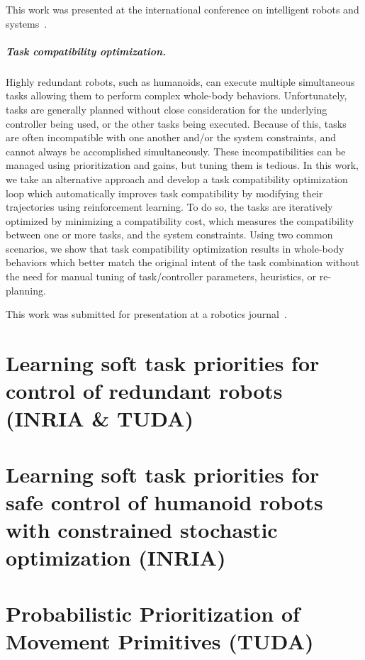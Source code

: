 \documentclass[12pt,a4paper,twoside]{report}
\begin{document}
This work was presented at the international conference on intelligent robots and systems~\cite{lober_IROS2015}.

\paragraph*{Task compatibility optimization.}

Highly redundant robots, such as humanoids, can execute multiple simultaneous tasks allowing them to perform complex whole-body behaviors. Unfortunately, tasks are generally planned without close consideration for the underlying controller being used, or the other tasks being executed. Because of this, tasks are often incompatible with one another and/or the system constraints, and cannot always be accomplished simultaneously. These incompatibilities can be managed using prioritization and gains, but tuning them is tedious. In this work, we take an alternative approach and develop a task compatibility optimization loop which automatically improves task compatibility by modifying their trajectories using reinforcement learning. To do so, the tasks are iteratively optimized by minimizing a compatibility cost, which measures the compatibility between one or more tasks, and the system constraints. Using two common scenarios, we show that task compatibility optimization results in whole-body behaviors which better match the original intent of the task combination without the need for manual tuning of task/controller parameters, heuristics, or re-planning.

This work was submitted for presentation at a robotics journal~\cite{lober2017RAL-IROS}.

\chapter{Learning soft task priorities for control of redundant robots (INRIA \& TUDA)}\label{sec:Valerio}


\chapter{Learning soft task priorities for safe control of humanoid robots with
constrained stochastic optimization (INRIA)}\label{sec:Valerio2}


\chapter{Probabilistic Prioritization of Movement Primitives (TUDA)}\label{sec:Alex}




\end{document}

